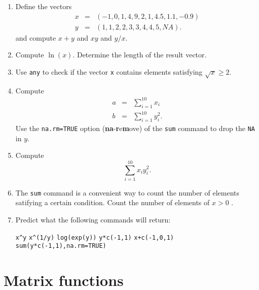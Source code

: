 \documentclass{article}
\begin{document}
\begin{enumerate}
\item Define the vectors%
\begin{eqnarray*}
x &=&\left( -1,0,1,4,9,2,1,4.5,1.1,-0.9\right) \\
y &=&\left( 1,1,2,2,3,3,4,4,5,NA\right) .
\end{eqnarray*}%
and compute $x+y$ and $xy$ and $y/x$.

\item Compute $\ln (x)$. Determine the length of the result vector.

\item Use \texttt{any} to check if the vector \texttt{x} contains elements
satisfying $\sqrt{x}\geq 2$.

\item Compute%
\begin{eqnarray*}
a &=&\sum_{i=1}^{10}x_{i} \\
b &=&\sum_{i=1}^{10}y_{i}^{2}.
\end{eqnarray*}%
Use the \texttt{na.rm=TRUE} option (\textbf{na}-\textbf{r}e\textbf{m}ove) of
the \texttt{sum} command to drop the \texttt{NA} in $y$.

\item Compute%
\begin{equation*}
\sum_{i=1}^{10}x_{i}y_{i}^{2}.
\end{equation*}

\item The \texttt{sum} command is a convenient way to count the number of
elements satifying a certain condition. Count the number of elements of $x>0$%
.

\item Predict what the following commands will return:

\texttt{x\textasciicircum y}\newline
\texttt{x\textasciicircum(1/y)}\newline
\texttt{log(exp(y))}\newline
\texttt{y*c(-1,1)}\newline
\texttt{x+c(-1,0,1)}\newline
\texttt{sum(y*c(-1,1),na.rm=TRUE)}
\end{enumerate}
\newpage


\section{Matrix functions}
\end{document}
